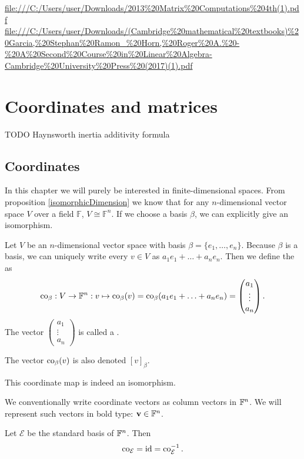 \url{file:///C:/Users/user/Downloads/2013%20Matrix%20Computations%204th(1).pdf}
\url{file:///C:/Users/user/Downloads/(Cambridge%20mathematical%20textbooks)%20Garcia,%20Stephan%20Ramon_%20Horn,%20Roger%20A.%20-%20A%20Second%20Course%20in%20Linear%20Algebra-Cambridge%20University%20Press%20(2017)(1).pdf}


\chapter{Coordinates and matrices}

TODO Haynsworth inertia additivity formula

\section{Coordinates}
In this chapter we will purely be interested in finite-dimensional spaces. From proposition \ref{isomorphicDimension} we know that for any $n$-dimensional vector space $V$ over a field $\mathbb{F}$, $V\cong \mathbb{F}^n$. If we choose a basis $\beta$, we can explicitly give an isomorphism.
\begin{definition}
Let $V$ be an $n$-dimensional vector space with basis $\beta = \{e_1,\ldots, e_n\}$. Because $\beta$ is a basis, we can uniquely write every $v\in V$ as $a_1e_1+\ldots +a_ne_n$. Then we define the  as
\[ \operatorname{co}_\beta: V \to \mathbb{F}^n: v \mapsto \operatorname{co}_\beta(v) = \operatorname{co}_\beta(a_1e_1+\ldots +a_ne_n) = \begin{pmatrix}
a_1 \\ \vdots \\ a_n
\end{pmatrix}. \]
The vector $\begin{pmatrix}
a_1 \\ \vdots \\ a_n
\end{pmatrix}$ is called a .

The vector $\operatorname{co}_\beta(v)$ is also denoted $[v]_\beta$.
\end{definition}
This coordinate map is indeed an isomorphism.

We conventionally write coordinate vectors as column vectors in $\mathbb{F}^n$. We will represent such vectors in bold type: $\boldsymbol{\mathrm{v}}\in\mathbb{F}^n$.

\begin{lemma}
Let $\mathcal{E}$ be the standard basis of $\mathbb{F}^n$. Then
\[ \operatorname{co}_\mathcal{E} = \operatorname{id} = \operatorname{co}_\mathcal{E}^{-1}. \]
\end{lemma}

